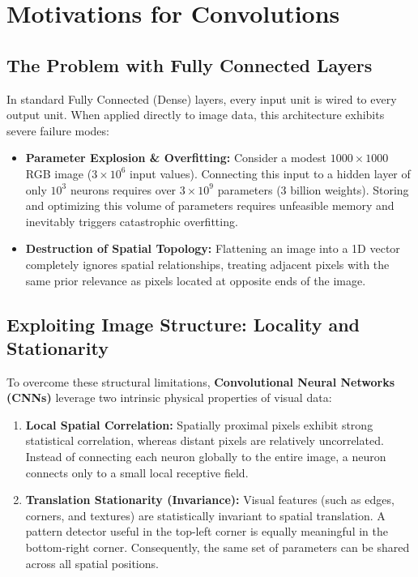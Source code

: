 \section{Motivations for Convolutions}

\subsection{The Problem with Fully Connected Layers}

In standard Fully Connected (Dense) layers, every input unit is wired to every output unit. When applied directly to image data, this architecture exhibits severe failure modes:

\begin{itemize}[leftmargin=*]
    \item \textbf{Parameter Explosion \& Overfitting:} Consider a modest $1000 \times 1000$ RGB image ($3 \times 10^6$ input values). Connecting this input to a hidden layer of only $10^3$ neurons requires over $3 \times 10^9$ parameters (3 billion weights). Storing and optimizing this volume of parameters requires unfeasible memory and inevitably triggers catastrophic overfitting.
    \item \textbf{Destruction of Spatial Topology:} Flattening an image into a 1D vector completely ignores spatial relationships, treating adjacent pixels with the same prior relevance as pixels located at opposite ends of the image.
\end{itemize}

\subsection{Exploiting Image Structure: Locality and Stationarity}

To overcome these structural limitations, \textbf{Convolutional Neural Networks (CNNs)} leverage two intrinsic physical properties of visual data:

\begin{enumerate}
    \item \textbf{Local Spatial Correlation:} Spatially proximal pixels exhibit strong statistical correlation, whereas distant pixels are relatively uncorrelated. Instead of connecting each neuron globally to the entire image, a neuron connects only to a small local receptive field.
    \item \textbf{Translation Stationarity (Invariance):} Visual features (such as edges, corners, and textures) are statistically invariant to spatial translation. A pattern detector useful in the top-left corner is equally meaningful in the bottom-right corner. Consequently, the same set of parameters can be shared across all spatial positions.
\end{enumerate}



